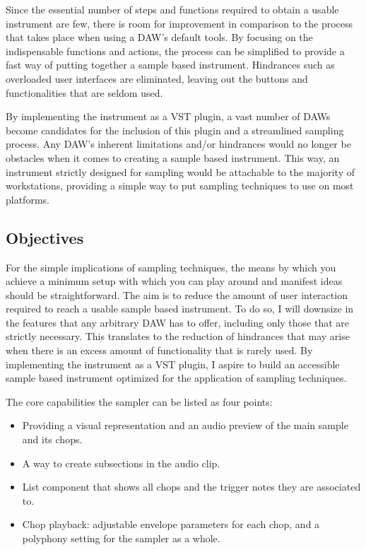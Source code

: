 \documentclass[12pt, a4paper, hidelinks]{article}
\begin{document}
	Since the essential number of steps and functions required to obtain a usable instrument are few, there is room for improvement in comparison to the process that takes place when using a DAW's default tools. By focusing on the indispensable functions and actions, the process can be simplified to provide a fast way of putting together a sample based instrument. Hindrances such as overloaded user interfaces are eliminated, leaving out the buttons and functionalities that are seldom used. \par
	
	By implementing the instrument as a VST plugin, a vast number of DAWs become candidates for the inclusion of this plugin and a streamlined sampling process. Any DAW's inherent limitations and/or hindrances would no longer be obstacles when it comes to creating a sample based instrument. This way, an instrument strictly designed for sampling would be attachable to the majority of workstations, providing a simple way to put sampling techniques to use on most platforms.
	  

	
	
	\newpage
	\subsection{Objectives}
	For the simple implications of sampling techniques, the means by which you achieve a minimum setup with which you can play around and manifest ideas should be straightforward. The aim is to reduce the amount of user interaction required to reach a usable sample based instrument. To do so, I will downsize in the features that any arbitrary DAW has to offer, including only those that are strictly necessary. This translates to the reduction of hindrances that may arise when there is an excess amount of functionality that is rarely used.  By implementing the instrument as a VST plugin, I aspire to build an accessible sample based instrument optimized for the application  of sampling techniques. %
	\par
	The core capabilities the sampler can be listed as four points:
	\begin{itemize}
		\item Providing a visual representation and an audio preview of the main 
		sample and its chops.
		\item A way to create subsections in the audio clip.
		\item List component that shows all chops and the trigger notes they are associated to.
		\item Chop playback: adjustable envelope parameters for each chop, and a polyphony setting for the sampler as a whole.
	\end{itemize}
	
\end{document}
